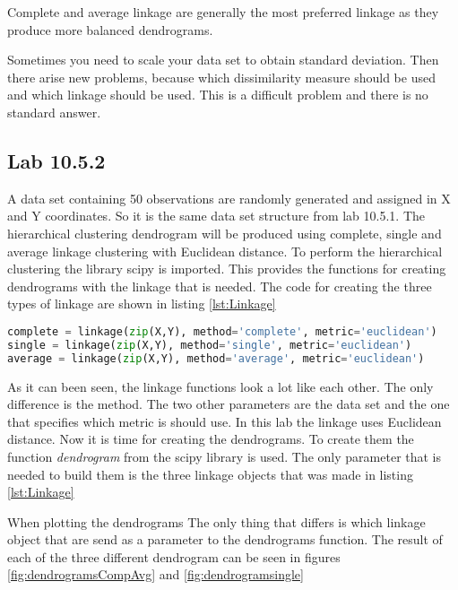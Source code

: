 Complete and average linkage are generally the most preferred linkage as they produce more balanced dendrograms. 

Sometimes you need to scale your data set to obtain standard deviation. Then there arise new problems, because which dissimilarity measure should be used and which linkage should be used. This is a difficult problem and there is no standard answer.

\subsection{Lab 10.5.2}
A data set containing 50 observations are randomly generated and assigned in X and Y coordinates. So it is the same data set structure from lab 10.5.1.
The hierarchical clustering dendrogram will be produced using complete, single and average linkage clustering with Euclidean distance.
To perform the hierarchical clustering the library scipy is imported. This provides the functions for creating dendrograms with the linkage that is needed. 
The code for creating the three types of linkage are shown in listing
\ref{lst:Linkage}

\begin{lstlisting}[language=Python, label=lst:Linkage, caption=The code that apllies the three different linkage on the data set]
complete = linkage(zip(X,Y), method='complete', metric='euclidean')
single = linkage(zip(X,Y), method='single', metric='euclidean') 
average = linkage(zip(X,Y), method='average', metric='euclidean')
\end{lstlisting}

As it can been seen, the linkage functions look a lot like each other. The only difference is the method. The two other parameters are the data set and the one that specifies which metric is should use. In this lab the linkage uses Euclidean distance. 
Now it is time for creating the dendrograms. To create them the function \emph{dendrogram} from the scipy library is used. The only parameter that is needed to build them is the three linkage objects that was made in listing \ref{lst:Linkage}

When plotting the dendrograms The only thing that differs is which linkage object that are send as a parameter to the dendrograms function.
The result of each of the three different dendrogram can be seen in figures \ref{fig:dendrogramsCompAvg} and \ref{fig:dendrogramsingle}



